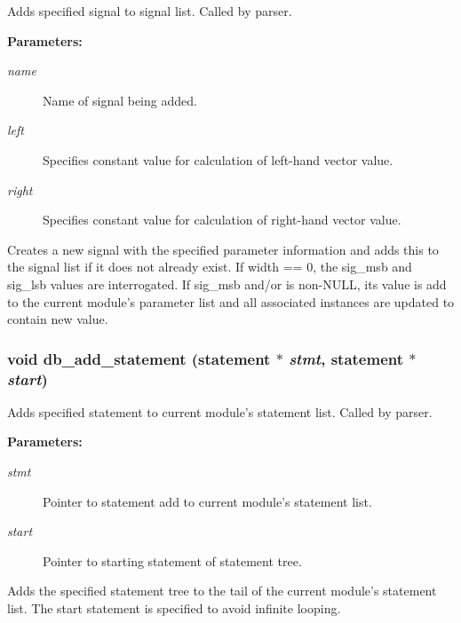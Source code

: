 Adds specified signal to signal list. Called by parser.

\begin{Desc}
\item[{\bf Parameters: }]\par
\begin{description}
\item[
{\em name}]Name of signal being added. \item[
{\em left}]Specifies constant value for calculation of left-hand vector value. \item[
{\em right}]Specifies constant value for calculation of right-hand vector value.

\end{description}
\end{Desc}
Creates a new signal with the specified parameter information and adds this to the signal list if it does not already exist. If width == 0, the sig\_\-msb and sig\_\-lsb values are interrogated. If sig\_\-msb and/or is non-NULL, its value is add to the current module's parameter list and all associated instances are updated to contain new value. 
\subsubsection{\setlength{\rightskip}{0pt plus 5cm}void db\_\-add\_\-statement ({\bf statement} $\ast$ {\em stmt}, {\bf statement} $\ast$ {\em start})}\label{db_8c_a31}


Adds specified statement to current module's statement list. Called by parser.

\begin{Desc}
\item[{\bf Parameters: }]\par
\begin{description}
\item[
{\em stmt}]Pointer to statement add to current module's statement list. \item[
{\em start}]Pointer to starting statement of statement tree.

\end{description}
\end{Desc}
Adds the specified statement tree to the tail of the current module's statement list. The start statement is specified to avoid infinite looping. 
